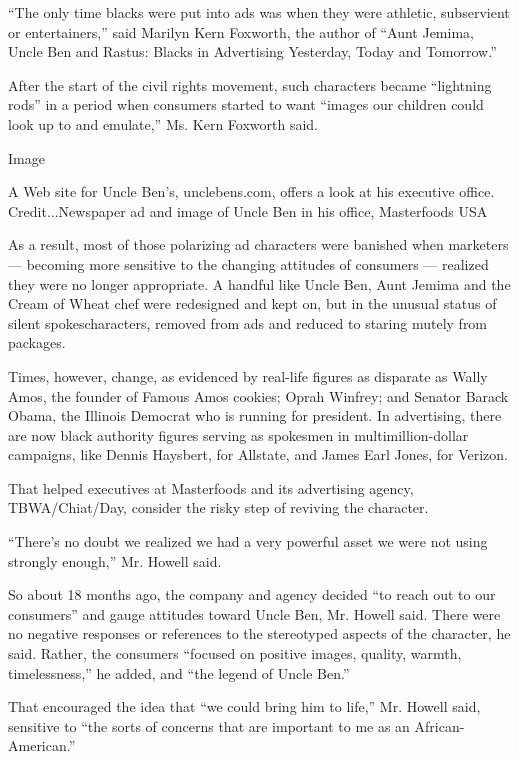 ``The only time blacks were put into ads was when they were athletic,
subservient or entertainers,'' said Marilyn Kern Foxworth, the author of
``Aunt Jemima, Uncle Ben and Rastus: Blacks in Advertising Yesterday,
Today and Tomorrow.''

After the start of the civil rights movement, such characters became
``lightning rods'' in a period when consumers started to want ``images
our children could look up to and emulate,'' Ms. Kern Foxworth said.

Image

A Web site for Uncle Ben's, unclebens.com, offers a look at his
executive office. Credit...Newspaper ad and image of Uncle Ben in his
office, Masterfoods USA

As a result, most of those polarizing ad characters were banished when
marketers --- becoming more sensitive to the changing attitudes of
consumers --- realized they were no longer appropriate. A handful like
Uncle Ben, Aunt Jemima and the Cream of Wheat chef were redesigned and
kept on, but in the unusual status of silent spokescharacters, removed
from ads and reduced to staring mutely from packages.

Times, however, change, as evidenced by real-life figures as disparate
as Wally Amos, the founder of Famous Amos cookies; Oprah Winfrey; and
Senator Barack Obama, the Illinois Democrat who is running for
president. In advertising, there are now black authority figures serving
as spokesmen in multimillion-dollar campaigns, like Dennis Haysbert, for
Allstate, and James Earl Jones, for Verizon.

That helped executives at Masterfoods and its advertising agency,
TBWA/Chiat/Day, consider the risky step of reviving the character.

``There's no doubt we realized we had a very powerful asset we were not
using strongly enough,'' Mr. Howell said.

So about 18 months ago, the company and agency decided ``to reach out to
our consumers'' and gauge attitudes toward Uncle Ben, Mr. Howell said.
There were no negative responses or references to the stereotyped
aspects of the character, he said. Rather, the consumers ``focused on
positive images, quality, warmth, timelessness,'' he added, and ``the
legend of Uncle Ben.''

That encouraged the idea that ``we could bring him to life,'' Mr. Howell
said, sensitive to ``the sorts of concerns that are important to me as
an African-American.''

